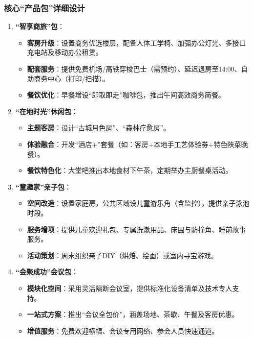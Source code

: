 \documentclass{cumcmthesis}
\begin{document}
\subsubsection{核心“产品包”详细设计}
\begin{enumerate}
    \item \textbf{“智享商旅”包}：
    \begin{itemize}
        \item \textbf{客房升级}：设置商务优选楼层，配备人体工学椅、加强办公灯光、多接口充电站及移动办公租赁。
        \item \textbf{配套服务}：提供免费机场/高铁穿梭巴士（需预约）、延迟退房至14:00、自助商务中心（打印/扫描）。
        \item \textbf{餐饮优化}：早餐增设“即取即走”咖啡包，推出午间高效商务简餐。
    \end{itemize}
    \item \textbf{“在地时光”休闲包}：
    \begin{itemize}
        \item \textbf{主题客房}：设计“古城月色房”、“森林疗愈房”。
        \item \textbf{体验融合}：开发“酒店+”套餐（如：客房+本地手工艺体验券+特色陕菜晚餐）。
        \item \textbf{餐饮特色化}：大堂吧推出本地食材下午茶，定期举办主厨餐桌活动。
    \end{itemize}
    \item \textbf{“童趣家”亲子包}：
    \begin{itemize}
        \item \textbf{空间改造}：设置家庭房，公共区域设儿童游乐角（含监控），提供亲子泳池时段。
        \item \textbf{服务增项}：提供儿童欢迎礼包、专属洗漱用品、床围与防撞角、睡前故事服务。
        \item \textbf{活动策划}：周末组织亲子DIY（烘焙、绘画）或室内寻宝游戏。
    \end{itemize}
    \item \textbf{“会聚成功”会议包}：
    \begin{itemize}
        \item \textbf{模块化空间}：采用灵活隔断会议室，提供标准化设备清单及技术专人支持。
        \item \textbf{一站式方案}：推出“会议全包价”，涵盖场地、茶歇、午餐及客房优惠。
        \item \textbf{增值服务}：免费欢迎横幅、会议专用网络、参会人员快速通道。
    \end{itemize}
\end{enumerate}
\end{document}
